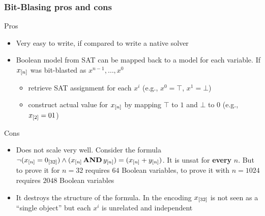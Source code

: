\begin{frame}
  \frametitle{Bit-Blasing pros and cons}

  \scriptsize

  Pros
  \begin{itemize}
    \item Very easy to write, if compared to write a native \bitvector solver \pause
    \vfill
    \item Boolean model from SAT can be mapped back to a model for each \bitvector variable.
	  If $x_{[n]}$ was bit-blasted as $x^{n-1}, \ldots, x^0$
	  \begin{itemize}
	    \item retrieve SAT assignment for each $x^i$ (e.g., $x^0 = \top$, $x^1 = \bot$)
	    \item construct actual value for $x_{[n]}$ by mapping $\top$ to $1$ and $\bot$ to $0$ (e.g., $x_{[2]} = 01$)
	  \end{itemize}
  \end{itemize}
  \vfill
  \pause
  Cons
  \begin{itemize}
    \item Does not scale very well. Consider the formula $\neg(x_{[n]} = 0_{[32]}) \wedge (x_{[n]} \,{\bf AND}\, y_{[n]}) = (x_{[n]} + y_{[n]})$.
          It is unsat for {\bf every} $n$. \pause But to prove it for $n=32$ requires $64$ Boolean variables, to prove it with $n=1024$
	  requires $2048$ Boolean variables
    \vfill
    \pause
    \item It destroys the structure of the formula. In the encoding $x_{[32]}$ is not seen as a ``single object'' but each
          $x^i$ is unrelated and independent
  \end{itemize}

\end{frame}
